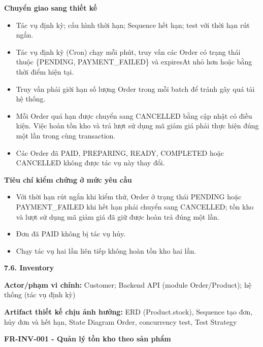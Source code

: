 \documentclass[11pt,a4paper,oneside]{report}
\begin{document}
\textbf{Chuyển giao sang thiết kế}

\begin{itemize}
\item
  Tác vụ định kỳ; cấu hình thời hạn; Sequence hết hạn; test với thời hạn rút ngắn.
\item
  Tác vụ định kỳ (Cron) chạy mỗi phút, truy vấn các Order có trạng thái thuộc \{PENDING, PAYMENT\_FAILED\} và expiresAt nhỏ hơn hoặc bằng thời điểm hiện tại.
\item
  Truy vấn phải giới hạn số lượng Order trong mỗi batch để tránh gây quá tải hệ thống.
\item
  Mỗi Order quá hạn được chuyển sang CANCELLED bằng cập nhật có điều kiện. Việc hoàn tồn kho và trả lượt sử dụng mã giảm giá phải thực hiện đúng một lần trong cùng transaction.
\item
  Các Order đã PAID, PREPARING, READY, COMPLETED hoặc CANCELLED không được tác vụ này thay đổi.
\end{itemize}

\textbf{Tiêu chí kiểm chứng ở mức yêu cầu}

\begin{itemize}
\item
  Với thời hạn rút ngắn khi kiểm thử, Order ở trạng thái PENDING hoặc PAYMENT\_FAILED khi hết hạn phải chuyển sang CANCELLED; tồn kho và lượt sử dụng mã giảm giá đã giữ được hoàn trả đúng một lần.
\item
  Đơn đã PAID không bị tác vụ hủy.
\item
  Chạy tác vụ hai lần liên tiếp không hoàn tồn kho hai lần.
\end{itemize}

\textbf{7.6. Inventory}

\textbf{Actor/phạm vi chính:} Customer; Backend API (module Order/Product); hệ thống (tác vụ định kỳ)

\textbf{Artifact thiết kế chịu ảnh hưởng:} ERD (Product.stock), Sequence tạo đơn, hủy đơn và hết hạn, State Diagram Order, concurrency test, Test Strategy

\textbf{FR-INV-001 - Quản lý tồn kho theo sản phẩm}
\end{document}
